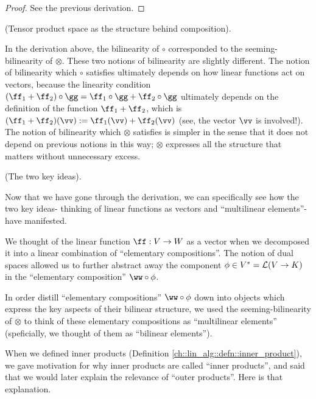 \begin{proof}
    See the previous derivation.
\end{proof}

\begin{remark}
    (Tensor product space as the structure behind composition).
    
    In the derivation above, the bilinearity of $\circ$ corresponded to the seeming-bilinearity of $\otimes$. These two notions of bilinearity are slightly different. The notion of bilinearity which $\circ$ satisfies ultimately depends on how linear functions act on vectors, because the linearity condition $(\ff_1 + \ff_2) \circ \gg = \ff_1 \circ \gg + \ff_2 \circ \gg$ ultimately depends on the definition of the function $\ff_1 + \ff_2$, which is $(\ff_1 + \ff_2)(\vv) := \ff_1(\vv) + \ff_2(\vv)$ (see, the vector $\vv$ is involved!). The notion of bilinearity which $\otimes$ satisfies is simpler in the sense that it does not depend on previous notions in this way; $\otimes$ expresses all the structure that matters without unnecessary excess.
\end{remark}

\begin{remark}
    (The two key ideas). 
    
    Now that we have gone through the derivation, we can specifically see how the two key ideas- thinking of linear functions as vectors and ``multilinear elements''- have manifested.
    
    We thought of the linear function $\ff:V \rightarrow W$ as a vector when we decomposed it into a linear combination of ``elementary compositions''. The notion of dual spaces allowed us to further abstract away the component $\phi \in V^* = \mathcal{L}(V \rightarrow K)$ in the ``elementary composition'' $\ww \circ \phi$.
    
    In order distill ``elementary compositions'' $\ww \circ \phi$ down into objects which express the key aspects of their bilinear structure, we used the seeming-bilinearity of $\otimes$ to think of these elementary compositions as ``multilinear elements'' (speficially, we thought of them as ``bilinear elements'').
\end{remark}

When we defined inner products (Definition \ref{ch::lin_alg::defn::inner_product}), we gave motivation for why inner products are called ``inner products'', and said that we would later explain the relevance of ``outer products''. Here is that explanation. 

